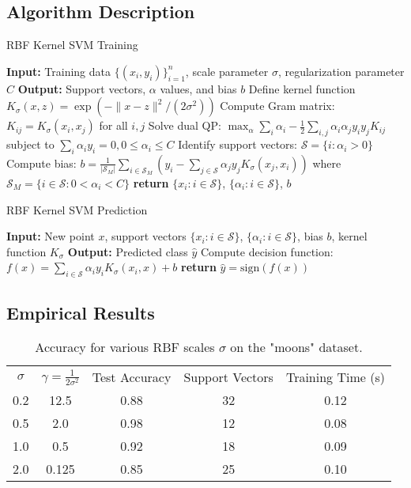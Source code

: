\documentclass[11pt]{article}
\begin{document}
\subsection{Algorithm Description}
\begin{algorithm}
\caption{RBF Kernel SVM Training}
\begin{algorithmic}[1]
\State \textbf{Input:} Training data $\{(x_i, y_i)\}_{i=1}^n$, scale parameter $\sigma$, regularization parameter $C$
\State \textbf{Output:} Support vectors, $\alpha$ values, and bias $b$
\State Define kernel function $K_\sigma(x,z) = \exp(-\|x-z\|^2/(2\sigma^2))$
\State Compute Gram matrix: $K_{ij} = K_\sigma(x_i, x_j)$ for all $i,j$
\State Solve dual QP: $\max_{\alpha} \sum_i \alpha_i - \frac{1}{2}\sum_{i,j}\alpha_i\alpha_j y_i y_j K_{ij}$ subject to $\sum_i \alpha_i y_i=0, 0 \leq \alpha_i \leq C$
\State Identify support vectors: $\mathcal{S} = \{i : \alpha_i > 0\}$
\State Compute bias: $b = \frac{1}{|\mathcal{S}_M|}\sum_{i \in \mathcal{S}_M} \left(y_i - \sum_{j \in \mathcal{S}} \alpha_j y_j K_\sigma(x_j, x_i)\right)$ where $\mathcal{S}_M = \{i \in \mathcal{S} : 0 < \alpha_i < C\}$
\State \textbf{return} $\{x_i : i \in \mathcal{S}\}$, $\{\alpha_i : i \in \mathcal{S}\}$, $b$
\end{algorithmic}
\end{algorithm}

\begin{algorithm}
\caption{RBF Kernel SVM Prediction}
\begin{algorithmic}[1]
\State \textbf{Input:} New point $x$, support vectors $\{x_i : i \in \mathcal{S}\}$, $\{\alpha_i : i \in \mathcal{S}\}$, bias $b$, kernel function $K_\sigma$
\State \textbf{Output:} Predicted class $\hat{y}$
\State Compute decision function: $f(x) = \sum_{i \in \mathcal{S}} \alpha_i y_i K_\sigma(x_i, x) + b$
\State \textbf{return} $\hat{y} = \text{sign}(f(x))$
\end{algorithmic}
\end{algorithm}

\subsection{Empirical Results}
\begin{table}[h]
  \centering
  \begin{tabular}{ccccc}
    $\sigma$ & $\gamma = \frac{1}{2\sigma^2}$ & Test Accuracy & Support Vectors & Training Time (s) \\
    0.2 & 12.5 & 0.88 & 32 & 0.12 \\
    0.5 & 2.0 & 0.98 & 12 & 0.08 \\
    1.0 & 0.5 & 0.92 & 18 & 0.09 \\
    2.0 & 0.125 & 0.85 & 25 & 0.10 \\
  \end{tabular}
  \caption{Accuracy for various RBF scales $\sigma$ on the "moons" dataset.}
\end{table}
\end{document}
